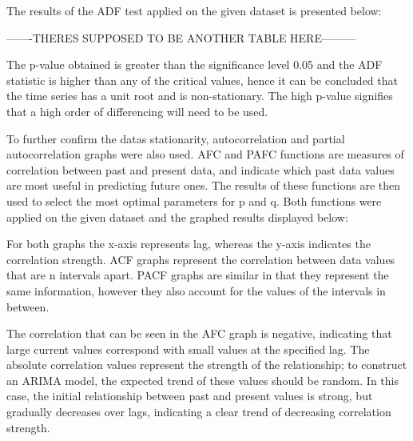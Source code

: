 \documentclass{mcmthesis}
\begin{document}
    The results of the ADF test applied on the given dataset is presented below:

    -------THERES SUPPOSED TO BE ANOTHER TABLE HERE---------

    The p-value obtained is greater than the significance level 0.05 and the ADF statistic is higher than any of the critical values, hence it can be concluded that the time series has a unit root and is non-stationary. The high p-value signifies that a high order of differencing will need to be used.

    To further confirm the data\textquotesingle s stationarity, autocorrelation and partial autocorrelation graphs were also used. AFC and PAFC functions are measures of correlation between past and present data, and indicate which past data values are most useful in predicting future ones.  The results of these functions are then used to select the most optimal parameters for p and q. Both functions were applied on the given dataset and the graphed results displayed below:

    \begin{center}
    \end{center}

    For both graphs the x-axis represents lag, whereas the y-axis indicates the correlation strength. ACF graphs represent the correlation between data values that are n intervals apart. PACF graphs are similar in that they represent the same information, however they also account for the values of the intervals in between.

    The correlation that can be seen in the AFC graph is negative, indicating that large current values correspond with small values at the specified lag. The absolute correlation values represent the strength of the relationship; to construct an ARIMA model, the expected trend of these values should be random. In this case, the initial relationship between past and present values is strong, but gradually decreases over lags, indicating a clear trend of decreasing correlation strength.
\end{document}
